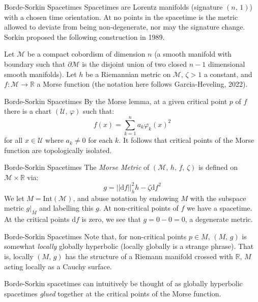 \documentclass{beamer}
\begin{document}
    \begin{frame}{Borde-Sorkin Spacetimes}
        Spacetimes are Lorentz manifolds (signature $(n,\,1)$) with a chosen
        time orientation. At no points in the spacetime is the metric allowed
        to deviate from being non-degenerate, nor may the signature change.
        Sorkin proposed the following construction in 1989.
        \par\hfill\par
        Let $\mathcal{M}$ be a compact cobordism of dimension $n$
        (a smooth manifold with boundary such that $\partial\mathcal{M}$ is the
        disjoint union of two closed $n-1$ dimensional smooth manifolds). Let
        $h$ be a Riemannian metric on $\mathcal{M}$, $\zeta>1$ a constant, and
        $f:\mathcal{M}\rightarrow\mathbb{R}$ a Morse function
        (the notation here follows Garcia-Heveling, 2022).
    \end{frame}
    \begin{frame}{Borde-Sorkin Spacetimes}
        By the Morse lemma, at a given critical point $p$ of $f$ there is a
        chart $(\mathcal{U},\,\varphi)$ such that:
        \begin{equation}
    	    f(x)=\sum_{k=1}^{n}a_{k}\varphi_{k}(x)^{2}
        \end{equation}
        for all $x\in\mathcal{U}$ where $a_{k}\ne{0}$ for each $k$. It follows
        that critical points of the Morse function are topologically isolated.
    \end{frame}
    \begin{frame}{Borde-Sorkin Spacetimes}
        The \textit{Morse Metric} of $(\mathcal{M},\,h,\,f,\,\zeta)$ is
        defined on $\mathcal{M}\times\mathbb{R}$ via:
        \begin{equation}
            g=||\textrm{d}f||^{2}_{h}h-\zeta\textrm{d}f^{2}
        \end{equation}
        We let $M=\textrm{Int}(\mathcal{M})$, and
        abuse notation by endowing $M$ with the subspace metric
        $g|_{M}$ and labelling this $g$. At non-critical points of $f$ we have
        a spacetime. At the critical points $\textrm{d}f$ is zero, we see that
        $g=0-0=0$, a degenerate metric.
    \end{frame}
    \begin{frame}{Borde-Sorkin Spacetimes}
        Note that, for non-critical points $p\in{M}$, $(M,\,g)$ is somewhat
        \textit{locally} globally hyperbolic (locally globally is a strange
        phrase). That is, locally $(M,\,g)$ has the structure of a Riemann
        manifold crossed with $\mathbb{R}$,
        $M$ acting locally as a Cauchy surface.
        \par\hfill\par
        Borde-Sorkin spacetimes can intuitively be thought of as
        globally hyperbolic spacetimes \textit{glued} together at the
        critical points of the Morse function.
    \end{frame}
\end{document}
